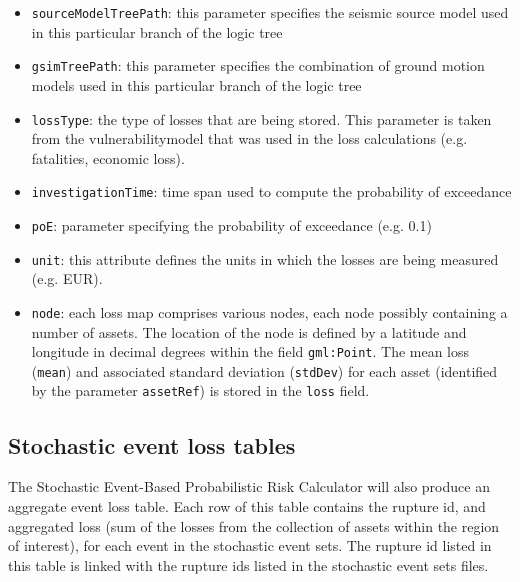 \begin{itemize}

  \item \Verb+sourceModelTreePath+: this parameter specifies the seismic
    source model used in this particular branch of the logic tree

  \item \Verb+gsimTreePath+: this parameter specifies the combination of
    ground motion models used in this particular branch of the logic tree

  \item \Verb+lossType+: the type of losses that are being stored. This
    parameter is taken from the \gls{vulnerabilitymodel} that was used in the
    loss calculations (e.g. fatalities, economic loss).

  \item \Verb+investigationTime+: time span used to compute the probability of
    exceedance
  
  \item \Verb+poE+: parameter specifying the probability of exceedance (e.g. 0.1)

  \item \Verb+unit+: this attribute defines the units in which the losses are
    being measured (e.g. EUR).

  \item \Verb+node+: each loss map comprises various nodes, each node possibly
    containing a number of \glspl{asset}. The location of the node is defined
    by a latitude and longitude in decimal degrees within the field
    \Verb+gml:Point+. The mean loss (\Verb+mean+) and associated standard
    deviation (\Verb+stdDev+) for each \gls{asset} (identified by the parameter
    \Verb+assetRef+) is stored in the \Verb+loss+ field.

\end{itemize}


\subsection{Stochastic event loss tables}

The Stochastic Event-Based Probabilistic Risk Calculator will also produce an
aggregate event loss table. Each row of this table contains the rupture id,
and aggregated loss (sum of the losses from the collection of assets within
the region of interest), for each event in the stochastic event sets. The
rupture id listed in this table is linked with the rupture ids listed in the
stochastic event sets files.

